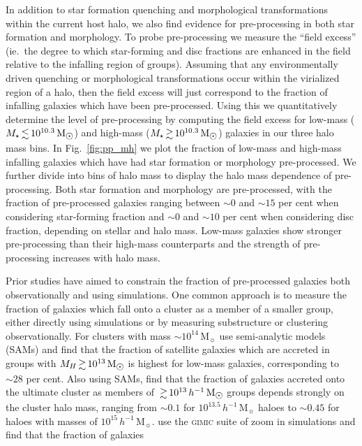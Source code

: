 \documentclass[a4paper,fleqn,usenatbib]{mnras}
\newcommand{\Msun}{\,\mathrm{M_{\sun}}}
\begin{document}
In addition to star formation quenching and morphological
transformations within the current host halo, we also find evidence
for pre-processing in both star formation and morphology.  To probe
pre-processing we measure the ``field excess'' (ie.\ the degree to
which star-forming and disc fractions are enhanced in the field
relative to the infalling region of groups).  Assuming that any
environmentally driven quenching or morphological transformations occur within the virialized region of a halo,
then the field excess will just correspond to the fraction of
infalling galaxies which have been pre-processed.  Using this we
quantitatively determine the level of pre-processing by computing the
field excess for low-mass ($M_\star \la
10^{10.3}\Msun$) and high-mass  ($M_\star \ga 10^{10.3}\Msun$)
galaxies in our three halo mass bins.  In Fig.~\ref{fig:pp_mh} we plot
the fraction of low-mass and high-mass infalling galaxies which have
had star formation or morphology pre-processed.  We further divide into
bins of halo mass to display the halo mass dependence of
pre-processing.  Both star formation and morphology are pre-processed,
with the fraction of pre-processed galaxies ranging between $\sim\!0$
and $\sim\!15$ per cent when considering star-forming fraction and
$\sim\!0$ and $\sim\!10$ per cent when considering disc fraction,
depending on stellar and halo mass.  Low-mass
galaxies show stronger pre-processing than their high-mass
counterparts and the
strength of pre-processing increases with halo mass. 
\par
Prior studies have aimed to constrain the
fraction of pre-processed galaxies both observationally and using
simulations.  One common approach is to measure the fraction of
galaxies which fall onto a cluster as a member of a smaller group,
either directly using simulations or by measuring substructure or
clustering observationally.  For clusters with mass $\sim
\!10^{14}\Msun$ \citet{delucia2012} use semi-analytic models (SAMs) and find
that the fraction of satellite galaxies which are accreted in groups
with $M_H \ga 10^{13}\Msun$ is highest for low-mass galaxies,
corresponding to $\sim\!28$ per cent.  Also using SAMs,
\citet{mcgee2009} find that the fraction of galaxies accreted onto the
ultimate cluster as members of $\ga 10^{13}\,h^{-1}\Msun$ groups depends
strongly on the cluster halo mass, ranging from $\sim\!0.1$ for
$10^{13.5}\,h^{-1}\Msun$ haloes to $\sim\!0.45$ for haloes with masses
of $10^{15}\,h^{-1}\Msun$.  \citet{bahe2013} use the \textsc{gimic}
suite of zoom in simulations and find that the fraction of galaxies
\end{document}
